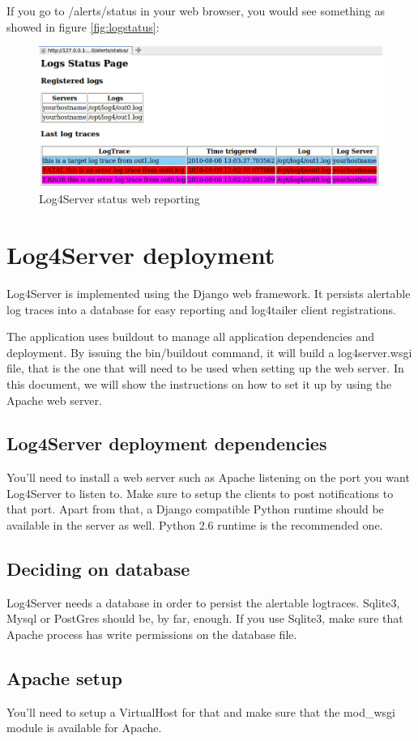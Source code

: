 \noindent
If you go to /alerts/status in your web browser, you would see something as showed in figure 
\autoref{fig:logstatus}:

\begin{figure}[ht]
\includegraphics[scale=0.50]{logstatus.png}
\caption{Log4Server status web reporting}\label{fig:logstatus}
\end{figure}

\section{Log4Server deployment}
Log4Server is implemented using the Django web framework. It persists alertable log traces into a 
database for easy reporting and log4tailer client registrations. 

The application uses buildout to manage all application dependencies and deployment. By issuing 
the bin/buildout command, it will build a log4server.wsgi file, that is the one that will need to 
be used when setting up the web server. In this document, we will show the instructions on how to 
set it up by using the Apache web server. 

\subsection{Log4Server deployment dependencies}

You'll need to install a web server such as Apache listening on the port you want Log4Server to listen 
to. Make sure to setup the clients to post notifications to that port. Apart from that, a Django 
compatible Python runtime should be available in the server as well. Python 2.6 runtime 
is the recommended one. 

\subsection{Deciding on database}

Log4Server needs a database in order to persist the alertable logtraces. Sqlite3, Mysql or PostGres 
should be, by far, enough. If you use Sqlite3, make sure that Apache process has write permissions 
on the database file. 

\subsection{Apache setup}

You'll need to setup a VirtualHost for that and make sure that the mod\_wsgi module is available 
for Apache. 

\newpage
